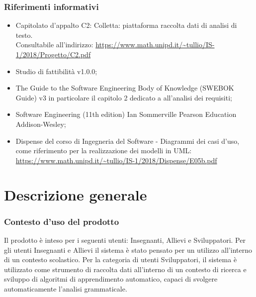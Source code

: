 \subsubsection{Riferimenti informativi}
\begin{itemize}
\item Capitolato d’appalto C2: Colletta: piattaforma raccolta dati di analisi di testo. \\ Consultabile all’indirizzo:
\url{https://www.math.unipd.it/~tullio/IS-1/2018/Progetto/C2.pdf}
\item Studio di fattibilità v1.0.0;
\item The Guide to the Software Engineering Body of Knowledge (SWEBOK Guide) v3 in particolare il capitolo 2 dedicato a all’analisi dei requisiti;
\item Software Engineering (11th edition) Ian Sommerville Pearson Education Addison-Wesley; 
\item Dispense del corso di Ingegneria del Software - Diagrammi dei casi d’uso, come riferimento per la realizzazione dei modelli in UML:
\url{https://www.math.unipd.it/~tullio/IS-1/2018/Dispense/E05b.pdf}
\end{itemize}
\newpage
\section{Descrizione generale}
\subsubsection{Contesto d’uso del prodotto}
Il prodotto è inteso per i seguenti utenti: Insegnanti, Allievi e Sviluppatori. Per gli utenti Insegnanti e Allievi il sistema è stato pensato per un utilizzo all’interno di un contesto scolastico. Per la categoria di utenti Sviluppatori, il sistema è utilizzato come strumento di raccolta dati all'interno di un contesto di ricerca e sviluppo di algoritmi di apprendimento automatico, capaci di svolgere automaticamente l'analisi grammaticale. 
